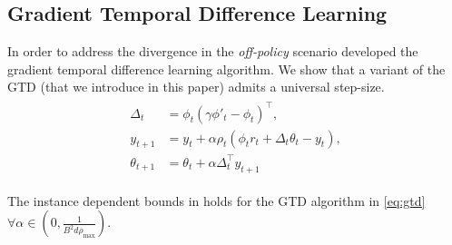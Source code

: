 \subsection{Gradient Temporal Difference Learning}
In order to address the divergence in the \emph{off-policy} scenario \citet{gtd} developed the gradient temporal difference learning algorithm. We show that a variant of the GTD (that we introduce in this paper) admits a universal step-size.
\begin{align}\label{eq:gtd}
\begin{split}
\Delta_t&=\phi_t(\gamma \phi'_t-\phi_t)^\top,\\
y_{t+1}&=y_t+\alpha\rho_t(\phi_t r_t+\Delta_t\theta_t -y_t),\\
\theta_{t+1}&=\theta_t+\alpha\Delta_t^\top y_{t+1}
\end{split}
\end{align}
\begin{theorem}\label{th:gtd}
The instance dependent bounds in  holds for the GTD algorithm in \eqref{eq:gtd} $\forall \alpha\in (0,\frac{1}{B^2d\rho_{\max}})$.
\end{theorem}
